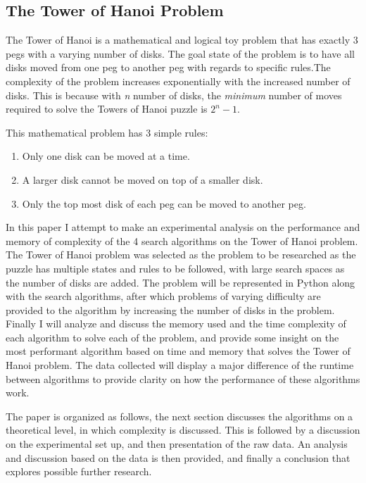 \documentclass[conference]{IEEEtran}
\begin{document}
\subsection{The Tower of Hanoi Problem}

The Tower of Hanoi is a mathematical and logical toy problem that has exactly 3 pegs with a varying number of disks. The goal state of the problem is to have all disks moved from one peg to another peg with regards to specific rules.The complexity of the problem increases exponentially with the increased number of disks. This is because with \textit {n} number of disks, the \textit{minimum} number of moves required to solve the Towers of Hanoi puzzle is $2^{n} - 1$. \cite{FamousPuzzles}

This mathematical problem has 3 simple rules:

\begin{enumerate}
\item Only one disk can be moved at a time.
\item A larger disk cannot be moved on top of a smaller disk.
\item Only the top most disk of each peg can be moved to another peg. 
\end{enumerate}

In this paper I attempt to make an experimental analysis on the performance and memory of complexity of the 4 search algorithms on the Tower of Hanoi problem. The Tower of Hanoi problem was selected as the problem to be researched as the puzzle has multiple states and rules to be followed, with large search spaces as the number of disks are added. The problem will be represented in Python along with the search algorithms, after which problems of varying difficulty are provided to the algorithm by increasing the number of disks in the problem. Finally I will analyze and discuss the memory used and the time complexity of each algorithm to solve each of the problem, and provide some insight on the most performant algorithm based on time and memory that solves the Tower of Hanoi problem. The data collected will display a major difference of the runtime between algorithms to provide clarity on how the performance of these algorithms work. 

The paper is organized as follows, the next section discusses the algorithms on a theoretical level, in which complexity is discussed. This is followed by a discussion on the experimental set up, and then presentation of the raw data. An analysis and discussion based on the data is then provided, and finally a conclusion that explores possible further research.
\end{document}
